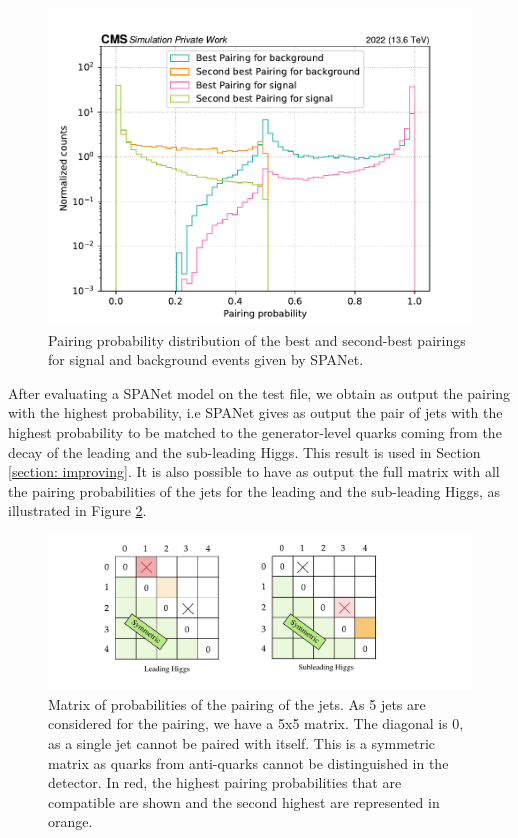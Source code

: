 \begin{figure}
    \centering
    \includegraphics[width=0.7\linewidth]{Images/7.S:B/Prob diff/best_and_second_beest_pairings.pdf}
    \caption{Pairing probability distribution of the best and second-best pairings for signal and background events given by SPANet.}
    \label{fig: prob value}
\end{figure}

After evaluating a SPANet model on the test file, we obtain as output the pairing with the highest probability, i.e SPANet gives as output the pair of jets with the highest probability to be matched to the generator-level quarks coming from the decay of the leading and the sub-leading Higgs. This result is used in Section \ref{section: improving}. It is also possible to have as output the full matrix with all the pairing probabilities of the jets for the leading and the sub-leading Higgs, as illustrated in Figure \ref{fig: probabilities matrix}.


\begin{figure}[hbt]
    \centering
    \includegraphics[width=0.8\linewidth]{Images/7.S:B/Prob diff/probability difference.pdf}
    \caption{Matrix of probabilities of the pairing of the jets. As 5 jets are considered for the pairing, we have a 5x5 matrix. The diagonal is 0, as a single jet cannot be paired with itself. This is a symmetric matrix as quarks from anti-quarks cannot be distinguished in the detector. In red, the highest pairing probabilities that are compatible are shown and the second highest are represented in orange.}
    \label{fig: probabilities matrix}
\end{figure}

